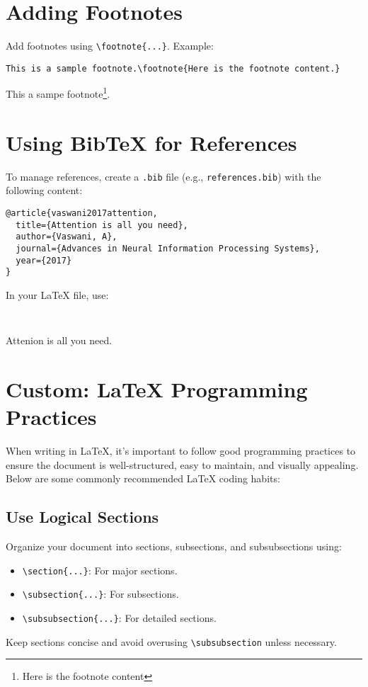 \documentclass[12pt]{article}
\begin{document}
\section{Adding Footnotes}
Add footnotes using \texttt{\textbackslash footnote\{...\}}. Example:
\begin{lstlisting}
This is a sample footnote.\footnote{Here is the footnote content.}
\end{lstlisting}
This a sampe footnote\footnote{Here is the footnote content}.
\section{Using BibTeX for References}
To manage references, create a \texttt{.bib} file (e.g., \texttt{references.bib}) with the following content:
\begin{lstlisting}
@article{vaswani2017attention,
  title={Attention is all you need},
  author={Vaswani, A},
  journal={Advances in Neural Information Processing Systems},
  year={2017}
}
\end{lstlisting}

In your LaTeX file, use:
\begin{lstlisting}


\end{lstlisting}
Attenion is all you need\cite{vaswani2017attention}.

\section{Custom: LaTeX Programming Practices}
\label{sec:customs}
When writing in LaTeX, it's important to follow good programming practices to ensure the document is well-structured, easy to maintain, and visually appealing. Below are some commonly recommended LaTeX coding habits:

\subsection*{Use Logical Sections}
Organize your document into sections, subsections, and subsubsections using:
\begin{itemize}
    \item \texttt{\textbackslash section\{...\}}: For major sections.
    \item \texttt{\textbackslash subsection\{...\}}: For subsections.
    \item \texttt{\textbackslash subsubsection\{...\}}: For detailed sections.
\end{itemize}
Keep sections concise and avoid overusing \texttt{\textbackslash subsubsection} unless necessary.
\end{document}
